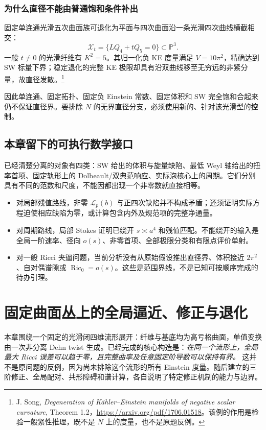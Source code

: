 \documentclass[UTF8,fontset=fandol,zihao=-4,oneside,openany]{ctexbook}
\theoremstyle{cjkplain}
\numberwithin{equation}{chapter}
\begin{document}
\subsection{为什么直径不能由普通饱和条件补出}
固定单连通光滑五次曲面族可退化为平面与四次曲面沿一条光滑四次曲线横截相交：
\[
\mathcal X_t=\{LQ_4+tQ_5=0\}\subset\mathbb P^3.
\]
一般 $t\ne0$ 的光滑纤维有 $K^2=5$。其归一化负 KE 度量满足 $V=10\pi^2$，精确达到 SW 标量下界；稳定退化的完整 KE 极限却具有沿双曲线移至无穷远的非紧分量，故直径发散。\footnote{J. Song, \emph{Degeneration of Kähler--Einstein manifolds of negative scalar curvature}, Theorem 1.2，\url{https://arxiv.org/pdf/1706.01518}。该例的作用是检验一般紧性推理，既不是 $N$ 上的度量，也不是原题反例。}

因此单连通、固定拓扑、固定负 Einstein 常数、固定体积和 SW 完全饱和合起来仍不保证直径界。要排除 $N$ 的无界直径分支，必须使用新的、针对该光滑型的控制。

\section{本章留下的可执行数学接口}
\label{GAU:interfaces}

已经清楚分离的对象有四类：SW 给出的体积与旋量缺陷、最低 Weyl 轴给出的扭率首项、固定轨形上的 Dolbeault/双典范响应、实际泡核心上的周期。它们分别具有不同的范数和尺度，不能因都出现一个非零数就直接相等。

\begin{itemize}
\item 对局部残值路线，非零 $\mathcal L_p(b)$ 与正四次缺陷并不构成矛盾；还须证明实际方程迫使相应缺陷为零，或计算包含内外及规范项的完整净通量。
\item 对周期路线，局部 Stokes 证明已绕开 $s\asymp a^4$ 和残值匹配。不能绕开的输入是全局一阶速率、径向 $o(s)$、非零首项、全部极限分类和有限点评价单射。
\item 对一般 Ricci 夹逼问题，当前分析没有从原始假设推出直径界、体积接近 $2\pi^2$、自对偶谱隙或 $\operatorname{Ric}_0=o(s)$。这些是范围界线，不是已知可按顺序完成的待办引理。
\end{itemize}




\chapter{固定曲面丛上的全局逼近、修正与退化}
\label{BUN:chapter}

本章围绕一个固定的光滑闭四维流形展开：纤维与基底均为高亏格曲面，单值变换由一次非分离 Dehn twist 生成。已经完成的核心构造是：\emph{在同一个流形上，全局最大 Ricci 误差可以趋于零，且完整曲率及任意固定阶导数可以保持有界。} 这并不是原问题的反例，因为尚未排除这个流形的所有 Einstein 度量。随后建立的三阶修正、全局配对、共形障碍和谱计算，各自说明了特定修正机制的能力与边界。
\end{document}
